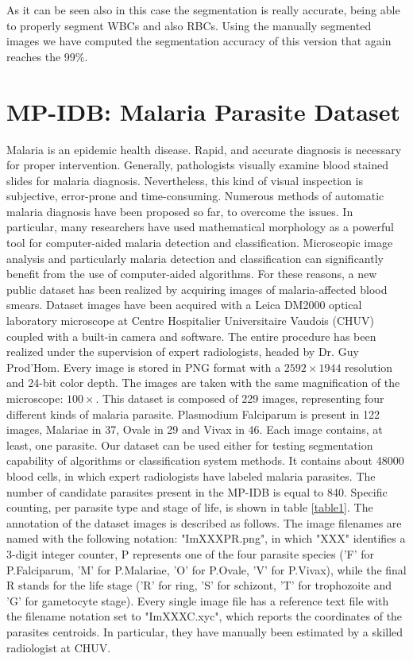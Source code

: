 {	As it can be seen also in this case the segmentation is really accurate, being able to properly segment WBCs and also RBCs. Using the manually segmented images we have computed the segmentation accuracy of this version that again reaches the 99\%. 
	
	\section{MP-IDB: Malaria Parasite Dataset}
	Malaria is an epidemic health disease. Rapid, and accurate diagnosis is necessary for proper intervention. Generally, pathologists visually examine blood stained slides for malaria diagnosis. 
	Nevertheless, this kind of visual inspection is subjective, error-prone and time-consuming. Numerous methods of automatic malaria diagnosis have been proposed so far, to overcome the issues. In particular, many researchers have used mathematical morphology as a powerful tool for computer-aided malaria detection and classification.
	Microscopic image analysis and particularly malaria detection and classification can significantly benefit from the use of computer-aided algorithms. For these reasons, a new public dataset has been realized by acquiring images of malaria-affected blood smears.
	Dataset images have been acquired with a Leica DM2000 optical laboratory microscope at Centre Hospitalier Universitaire Vaudois (CHUV) coupled with a built-in camera and software. The entire procedure has been realized under the supervision of expert radiologists, headed by Dr. Guy Prod'Hom. Every image is stored in PNG format with a $2592\times1944$ resolution and 24-bit color depth. The images are taken with the same magnification of the microscope: $100\times$.
	This dataset is composed of 229 images, representing four different kinds of malaria parasite. Plasmodium Falciparum is present in 122 images, Malariae in 37, Ovale in 29 and Vivax in 46. Each image contains, at least, one parasite. Our dataset can be used either for testing segmentation capability of algorithms or classification system methods. 
	It contains about 48000 blood cells, in which expert radiologists have labeled malaria parasites. The number of candidate parasites present in the MP-IDB is equal to 840. Specific counting, per parasite type and stage of life, is shown in table \ref{table1}.
	The annotation of the dataset images is described as follows. The image filenames are named with the following notation: "ImXXXPR.png", in which "XXX" identifies a 3-digit integer counter, P represents one of the four parasite species ('F' for P.Falciparum, 'M' for P.Malariae, 'O' for P.Ovale, 'V' for P.Vivax), while the final R stands for the life stage ('R' for ring, 'S' for schizont, 'T' for trophozoite and 'G' for gametocyte stage). Every single image file has a reference text file with the filename notation set to "ImXXXC.xyc", which reports the coordinates of the parasites centroids. In particular, they have manually been estimated by a skilled radiologist at CHUV. 
}
